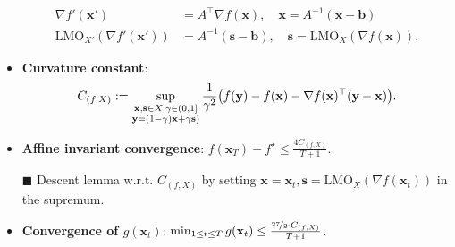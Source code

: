 \documentclass[a4paper]{article}
\newcommand{\lft}{\mathopen{}\mathclose\bgroup\left}
\newcommand{\rgt}{\aftergroup\egroup\right}
\renewcommand{\vec}[1]{\mathbf{#1}}
\newcommand{\mat}[1]{#1}
\newcommand{\proofsquare}{$\blacksquare$}
\newenvironment{topic}[1]
{\textbf{\sffamily \colorbox{black}{\rlap{\textbf{\textcolor{white}{#1}}}\hspace{\linewidth}\hspace{-2\fboxsep}}} \\ \vspace{0.2cm}}
{}
\begin{document}
\begin{multicols*}{2}
\begin{topic}{Frank-Wolfe}
\begin{itemize}
                  \begin{align*}
                      \nabla f'(\vec{x}')                    & = \mat{A}^\top \nabla f(\vec{x}), \quad \vec{x} = \mat{A}^{-1} (\vec{x} - \vec{b})    \\
                      \mathrm{LMO}_{X'}(\nabla f'(\vec{x}')) & = \mat{A}^{-1}(\vec{s} - \vec{b}), \quad \vec{s} = \mathrm{LMO}_X(\nabla f(\vec{x})).
                  \end{align*}
            \item \textbf{Curvature constant}: \[
                      C_{(f,X)} := \sup_{\substack{\vec{x}, \vec{s}\in X, \gamma \in (0,1] \\ \vec{y} = (1-\gamma)\vec{x} + \gamma \vec{s})}} \frac{1}{\gamma^2}\lft( f(\vec{y}) - f(\vec{x}) - \nabla f(\vec{x})^\top (\vec{y} - \vec{x}) \rgt).
                  \]
            \item \textbf{Affine invariant convergence}: $f(\vec{x}_T) - f^\star \leq \frac{4 C_{(f,X)}}{T+1}$.
            \item[\proofsquare] Descent lemma w.r.t. $C_{(f,X)}$ by setting $\vec{x} = \vec{x}_t, \vec{s} = \mathrm{LMO}_X(\nabla f(\vec{x}_t))$ in the supremum.
            \item \textbf{Convergence of $g(\vec{x}_t)$}: $\min_{1 \leq t \leq T} g(\vec{x}_t) \leq \frac{\nicefrac{27}{2} \cdot C_{(f, X)}}{T+1}$.
        \end{itemize}
    \end{topic}


\end{multicols*}
\end{document}
